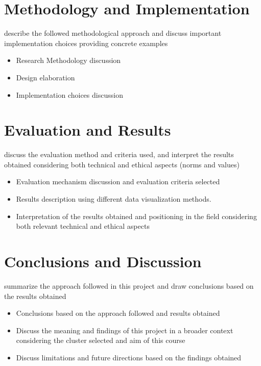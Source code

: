 \documentclass[]{article}
\begin{document}
\section{Methodology and Implementation}
describe the followed methodological approach and discuss important implementation choices providing concrete examples
\begin{itemize}
    \item Research Methodology discussion
    \item Design elaboration
    \item Implementation choices discussion
\end{itemize}

\section{Evaluation and Results}
discuss the evaluation method and criteria used, and interpret the results obtained considering both technical and ethical aspects (norms and values)
\begin{itemize}
    \item Evaluation mechanism discussion and evaluation criteria selected
    \item Results description using different data visualization methods.
    \item Interpretation of the results obtained and positioning in the field considering both relevant technical and ethical aspects
\end{itemize}

\section{Conclusions and Discussion}
summarize the approach followed in this project and draw conclusions based on the results obtained
\begin{itemize}
    \item Conclusions based on the approach followed and results obtained
    \item Discuss the meaning and findings of this project in a broader context considering the cluster selected and aim of this course
    \item Discuss limitations and future directions based on the findings obtained
\end{itemize}

\printbibliography
\end{document}
